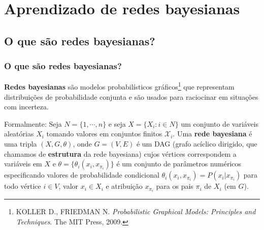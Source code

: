 \documentclass{beamer}
\begin{document}
  \section{Aprendizado de redes bayesianas}

  \subsection{O que são redes bayesianas?}

  \begin{frame}
    \frametitle{O que são redes bayesianas?}

    \textbf{Redes bayesianas} são modelos probabilísticos gráficos\footnote{\scriptsize KOLLER D., FRIEDMAN N. \emph{Probabilistic Graphical Models: Principles and Techniques}. The MIT Press, 2009.} que representam distribuições de probabilidade conjunta e são usados para raciocinar em situações com incerteza.

    \vspace{1em}

    {\footnotesize
      Formalmente: Seja $N = \{ 1, \cdots, n \}$ e seja $X = \{X_i : i \in N\}$ um conjunto de variáveis aleatórias $X_i$ tomando valores em conjuntos finitos $\mathcal{X}_i$. Uma \textbf{rede bayesiana} é uma tripla $(X, G, \theta)$, onde $G = (V, E)$ é um DAG (grafo acíclico dirigido, que chamamos de \textbf{estrutura} da rede bayesiana) cujos vértices correspondem a variáveis em $X$ e $\theta = \{\theta_i(x_i, x_{\pi_i})\}$ é um conjunto de parâmetros numéricos especificando valores de probabilidade condicional $\theta_i(x_i, x_{\pi_i}) = P(x_i | x_{\pi_i})$ para todo vértice $i \in V$, valor $x_i \in X_i$ e atribuição $x_{\pi_i}$ para os pais $\pi_i$ de $X_i$ (em $G$).
    }
  \end{frame}
\end{document}
